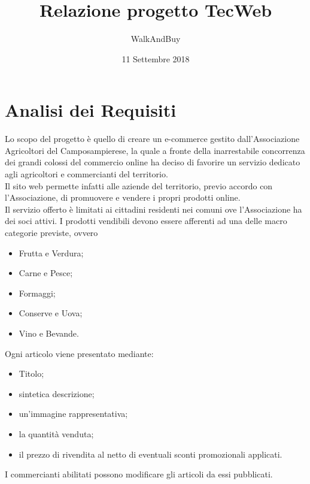 



\title{\textbf{Relazione progetto TecWeb}}
\author{WalkAndBuy}

\date{11 Settembre 2018}




\makeFrontPage

\tableofcontents

\newpage

\section{Analisi dei Requisiti}

Lo scopo del progetto è quello di creare un e-commerce gestito dall’Associazione Agricoltori del Camposampierese, la quale a fronte della inarrestabile concorrenza dei grandi colossi del commercio online ha deciso di favorire un servizio dedicato agli agricoltori e commercianti del territorio.\\
Il sito web permette infatti alle aziende del territorio, previo accordo con l’Associazione, di promuovere e vendere i propri prodotti online. \\
Il servizio offerto è limitati ai cittadini residenti nei comuni ove l’Associazione ha dei soci attivi. 
I prodotti vendibili devono essere afferenti ad una delle macro categorie previste, ovvero 
\begin{itemize}
	\item Frutta e Verdura;
	\item Carne e Pesce;
	\item Formaggi;
	\item Conserve e Uova;
	\item Vino e Bevande.
\end{itemize}
Ogni articolo viene presentato mediante:
\begin{itemize}
	\item Titolo;
	\item sintetica descrizione;
	\item un’immagine rappresentativa;
	\item la quantità venduta;
	\item il prezzo di rivendita al netto di eventuali sconti promozionali applicati.
\end{itemize}
I commercianti abilitati possono modificare gli articoli da essi pubblicati.\\

